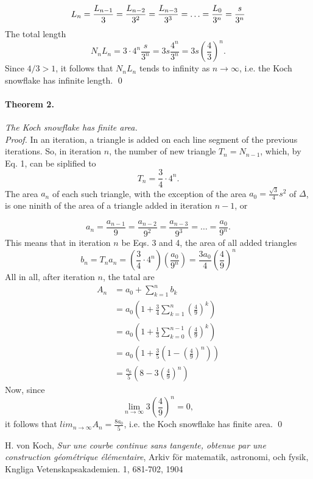 \documentclass[a4paper]{article}
\begin{document}
\begin{equation}
	L_n = \frac {L_{n-1}} {3} = \frac {L_{n - 2}} {3^2} = \frac {L_{n - 3}} {3^3} = \ldots = 
		\frac{L_0} {3^n} = \frac s {3^n}
\end{equation}
The total length
$$
	N_nL_n = 3 \cdot 4^n \frac s {3^n} = 3s \frac {4^n} {3^n} = 3s \left (
		\frac 4 3
	\right )^n.
$$
Since $4 / 3 > 1$, it follows that $N_nL_n$ tends to infinity as
$n \to \infty$, i.e. the Koch snowflake has infinite length. 
\hfill \qed
\paragraph{Theorem 2.} \emph{The Koch snowflake has finite area.}\\
\emph{Proof.} In an iteration, a triangle is added on each line segment of the
previous iterations. So, in iteration $n$, the number of new triangle
$T_n = N_{n-1}$, which, by Eq. 1, can be siplified to
\begin{equation}
	T_n = \frac 3 4 \cdot 4^n.
\end{equation}
The area $a_n$ of each such triangle, with the exception of the area
$a_0 = \frac {\sqrt 3} 4 s^2$ of $\Delta$, is one ninith of the area of a 
triangle added in iteration $n - 1$, or

\begin{equation}
	a_n = \frac {a_{n-1}} {9}
		= \frac {a_{n-2}} {9^2}
		= \frac {a_{n-3}} {9^3}
		= \ldots
		= \frac {a_0} {9^n}.
\end{equation}
This means that in iteration $n$ be Eqs. 3 and 4, the area of all added
triangles
$$
	b_n = T_na_n = \left (
		\frac 3 4 \cdot 4^n
	\right )
	\left (
		\frac {a_0} {9^n}
	\right ) = \frac {3a_0} 4 \left (
	\frac 4 9
	\right )^n
$$
All in all, after iteration $n$, the tatal are 
\newcommand{\ubersum}[2] {
	\sum_{k=#2}^{n#1}
}
\begin{align*}
	A_n &= a_0 + \ubersum{}{1} b_k \\
		&= a_0 \left (
				1 + \frac 3 4 \ubersum{}{1}\left(\frac 4 9 \right )^k
			\right ) \\
		&= a_0 \left (
				1 + \frac 1 3 \ubersum{-1}{0}\left(\frac 4 9 \right )^k
			\right ) \\
		&= a_0 \left (
				1 + \frac 3 5 \left ( 1 - \left( \frac 4 9 \right )^n \right )
			\right ) \\
		&= \frac {a_0} 5 \left (
				8 - 3 \left ( \frac 4 9 \right )^n
			\right )
\end{align*}
Now, since
$$
	\lim_{n \to \infty} 3 \left ( \frac 4 9 \right )^n = 0,
$$
it follows that $lim_{n \to \infty} A_n = \frac {8a_0} 5$, i.e. the Koch 
snowflake has finite area. \hfill \qed

\begin{thebibliography}{9}
		H. von Koch,
		\emph{Sur une courbe continue sans tangente, obtenue par une
		construction géométrique élémentaire},
		Arkiv för matematik, astronomi, och fysik, Kngliga Vetenskapsakademien.
		1,
		681-702,
		1904
\end{thebibliography}


\end{document}
